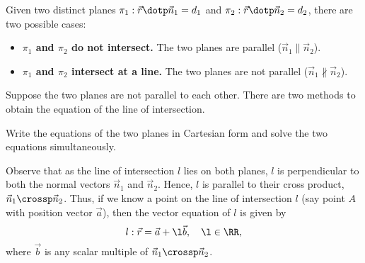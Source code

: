 \begin{fact}
    Given two distinct planes $\pi_1 : \vec r \dotp \vec n_1 = d_1$ and $\pi_2 : \vec r \dotp \vec n_2 = d_2$, there are two possible cases:
    \begin{itemize}
        \item \textbf{$\pi_1$ and $\pi_2$ do not intersect.} The two planes are parallel ($\vec n_1 \parallel \vec n_2$).
        \item \textbf{$\pi_1$ and $\pi_2$ intersect at a line.} The two planes are not parallel ($\vec n_1 \nparallel \vec n_2$).
    \end{itemize}
\end{fact}

Suppose the two planes are not parallel to each other. There are two methods to obtain the equation of the line of intersection.

\begin{recipe}
    Write the equations of the two planes in Cartesian form and solve the two equations simultaneously.
\end{recipe}
\begin{recipe}
    Observe that as the line of intersection $l$ lies on both planes, $l$ is perpendicular to both the normal vectors $\vec n_1$ and $\vec n_2$. Hence, $l$ is parallel to their cross product, $\vec n_1 \crossp \vec n_2$. Thus, if we know a point on the line of intersection $l$ (say point $A$ with position vector $\vec a$), then the vector equation of $l$ is given by \[l : \vec r = \vec a + \l \vec b, \quad \l \in \RR,\] where $\vec b$ is any scalar multiple of $\vec n_1 \crossp \vec n_2$.
\end{recipe}